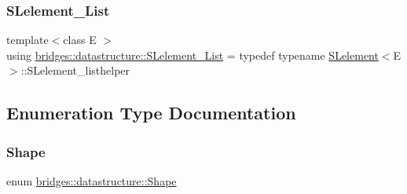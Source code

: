 \mbox{\label{namespacebridges_1_1datastructure_a0db8f181ce44ed3dd8b3da7184c2364a}} 
\subsubsection{\texorpdfstring{S\+Lelement\+\_\+\+List}{SLelement\_List}}
{\footnotesize\ttfamily template$<$class E $>$ \\
using \hyperlink{namespacebridges_1_1datastructure_a0db8f181ce44ed3dd8b3da7184c2364a}{bridges\+::datastructure\+::\+S\+Lelement\+\_\+\+List} = typedef typename \hyperlink{classbridges_1_1datastructure_1_1_s_lelement}{S\+Lelement}$<$E$>$\+::S\+Lelement\+\_\+listhelper}



\subsection{Enumeration Type Documentation}
\mbox{\label{namespacebridges_1_1datastructure_a3408f5f44d9c6062e5f3adb7e1bbb7f0}} 
\subsubsection{\texorpdfstring{Shape}{Shape}}
{\footnotesize\ttfamily enum \hyperlink{namespacebridges_1_1datastructure_a3408f5f44d9c6062e5f3adb7e1bbb7f0}{bridges\+::datastructure\+::\+Shape}}

